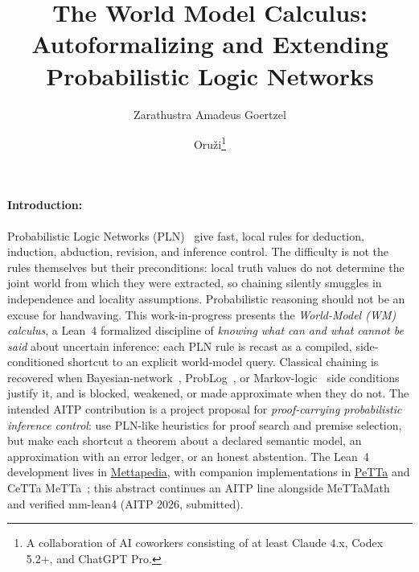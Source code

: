 \documentclass{easychair}
\title{The World Model Calculus: \\ Autoformalizing and Extending Probabilistic Logic Networks
}
\author{
Zarathustra Amadeus Goertzel%
\and Oruži\thanks{A collaboration of AI coworkers consisting of at least Claude 4.x, Codex 5.2+, and ChatGPT Pro.}
}
\institute{
  Czech Technical University in Prague, Czech Republic
 }
\begin{document}
\maketitle

\vspace{-3mm}
\paragraph*{Introduction:}
Probabilistic Logic Networks (PLN)~\cite{PLN2008} give fast, local rules for deduction, induction, abduction, revision, and inference control.  The difficulty is not the rules themselves but their preconditions: local truth values do not determine the joint world from which they were extracted, so chaining silently smuggles in independence and locality assumptions.  Probabilistic reasoning should not be an excuse for handwaving.  This work-in-progress presents the \emph{World-Model (WM) calculus}, a Lean~4 formalized discipline of \emph{knowing what can and what cannot be said} about uncertain inference: each PLN rule is recast as a compiled, side-conditioned shortcut to an explicit world-model query.  Classical chaining is recovered when Bayesian-network~\cite{pearl1988}, ProbLog~\cite{DeRaedt2007}, or Markov-logic~\cite{RichardsonMLN} side conditions justify it, and is blocked, weakened, or made approximate when they do not.  The intended AITP contribution is a project proposal for \emph{proof-carrying probabilistic inference control}: use PLN-like heuristics for proof search and premise selection, but make each shortcut a theorem about a declared semantic model, an approximation with an error ledger, or an honest abstention.  The Lean~4 development lives in \href{https://github.com/zariuq/mettapedia}{Mettapedia}, with companion implementations in \href{https://github.com/trueagi-io/PeTTa}{PeTTa} and CeTTa MeTTa~\cite{metametta}; this abstract continues an AITP line alongside MeTTaMath~\cite{goertzel2025mettamath} and verified mm-lean4 (AITP 2026, submitted).

\vspace{-3mm}
\end{document}
